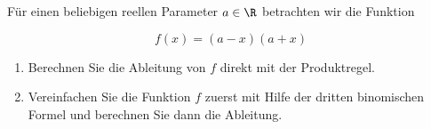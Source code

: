 \begin{ExerciseBlock}
Für einen beliebigen reellen Parameter $a \in \R$ betrachten wir die Funktion 

\begin{equation*}
	f(x)=(a-x)(a+x)
\end{equation*}

\begin{enumerate}[label=\alph*)]
	\item Berechnen Sie die Ableitung von $f$ direkt mit der Produktregel.
	\item Vereinfachen Sie die Funktion $f$ zuerst mit Hilfe der dritten binomischen Formel und berechnen Sie dann die Ableitung.
\end{enumerate}

\end{ExerciseBlock}
